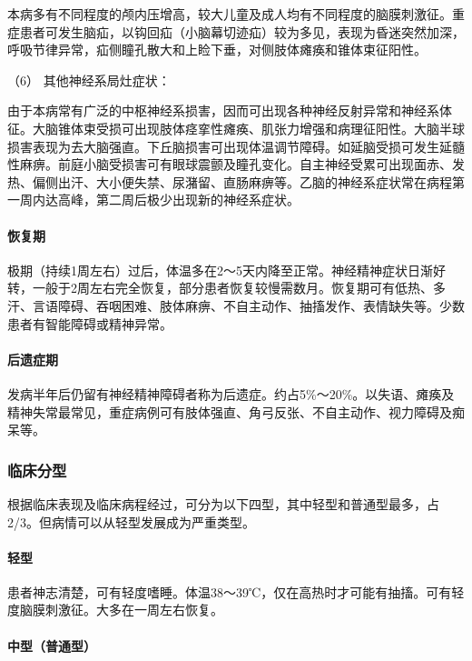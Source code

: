 本病多有不同程度的颅内压增高，较大儿童及成人均有不同程度的脑膜刺激征。重症患者可发生脑疝，以钩回疝（小脑幕切迹疝）较为多见，表现为昏迷突然加深，呼吸节律异常，疝侧瞳孔散大和上睑下垂，对侧肢体瘫痪和锥体束征阳性。

\hypertarget{text00219.htmlux5cux23CHP7-5-2-2-2-6}{}
（6） 其他神经系局灶症状：

由于本病常有广泛的中枢神经系损害，因而可出现各种神经反射异常和神经系体征。大脑锥体束受损可出现肢体痉挛性瘫痪、肌张力增强和病理征阳性。大脑半球损害表现为去大脑强直。下丘脑损害可出现体温调节障碍。如延脑受损可发生延髓性麻痹。前庭小脑受损害可有眼球震颤及瞳孔变化。自主神经受累可出现面赤、发热、偏侧出汗、大小便失禁、尿潴留、直肠麻痹等。乙脑的神经系症状常在病程第一周内达高峰，第二周后极少出现新的神经系症状。

\paragraph{恢复期}

极期（持续1周左右）过后，体温多在2～5天内降至正常。神经精神症状日渐好转，一般于2周左右完全恢复，部分患者恢复较慢需数月。恢复期可有低热、多汗、言语障碍、吞咽困难、肢体麻痹、不自主动作、抽搐发作、表情缺失等。少数患者有智能障碍或精神异常。

\paragraph{后遗症期}

发病半年后仍留有神经精神障碍者称为后遗症。约占5\%～20\%。以失语、瘫痪及精神失常最常见，重症病例可有肢体强直、角弓反张、不自主动作、视力障碍及痴呆等。

\subsubsection{临床分型}

根据临床表现及临床病程经过，可分为以下四型，其中轻型和普通型最多，占2/3。但病情可以从轻型发展成为严重类型。

\paragraph{轻型}

患者神志清楚，可有轻度嗜睡。体温38～39℃，仅在高热时才可能有抽搐。可有轻度脑膜刺激征。大多在一周左右恢复。

\paragraph{中型（普通型）}

